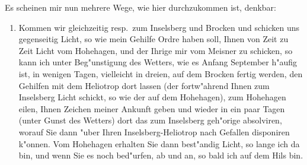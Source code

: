 \documentclass[12pt,a4paper]{article}
\theoremstyle{plain}
\theoremstyle{definition}
\theoremstyle{remark}
\begin{document}
Es scheinen mir nun mehrere Wege, wie hier durchzukommen ist, denkbar:
\begin{enumerate}[label=\arabic*)]
\item Kommen wir gleichzeitig resp.\ zum Inselsberg und Brocken und schicken uns gegenseitig Licht, so wie mein Gehilfe Ordre haben soll, Ihnen von Zeit zu Zeit Licht vom Hohehagen, und der Ihrige mir vom Meisner zu schicken, so kann ich unter Beg"unstigung des Wetters, wie es Anfang September h"aufig ist, in wenigen Tagen, vielleicht in dreien, auf dem Brocken fertig werden, den Gehilfen mit dem Heliotrop dort lassen (der fortw"ahrend Ihnen zum Inselsberg Licht schickt, so wie der auf dem Hohehagen), zum Hohehagen eilen, Ihnen Zeichen meiner Ankunft geben und wieder in ein paar Tagen (unter Gunst des Wetters) dort das zum Inselsberg geh"orige absolviren, worauf Sie dann "uber Ihren Inselsberg-Heliotrop nach Gefallen disponiren k"onnen. Vom Hohehagen erhalten Sie dann best"andig Licht, so lange ich da bin, und wenn Sie es noch bed"urfen, ab und an, so bald ich auf dem Hils bin.


\end{enumerate}
\end{document}
